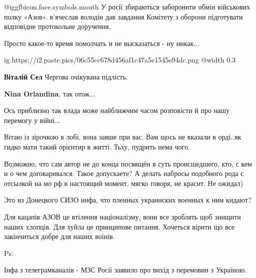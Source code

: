 \begin{itemize}
 @igg{fbicon.face.symbols.mouth}  У росії збираються заборонити обмін військових полку «Азов».
в'ячеслав володін дав завдання Комітету з оборони підготувати відповідне протокольне доручення.

Просто какое-то время помолчать и не высказаться - ну никак...


\ifcmt
  ig https://i2.paste.pics/06c55cc678d456af1c47a5e1545e94dc.png
  @width 0.3
\fi

\begin{itemize} %
\textbf{Віталій Сел} Чергова очікувана підлість.

\textbf{Nina Orlandina}, так отож...
\end{itemize} %

Ось приблизно так влада може найближчим часом розповісти й про нашу перемогу у війні...


Вітаю із зірочкою в лобі, вона завше при вас. Вам щось не вказали в орді..як
гидко мати такий орієнтир в житті. Тьху, пудрить нема чого.


Возможно, что сам автор не до конца посвящён в суть происшедшего, кто, с кем и
о чем договаривался. Такое допускаете? А делать набросы подобного рода с
отсылкой на мо рф в настоящий момент, мягко говоря, не красит. Не ожидал)


Это из Донецкого СИЗО инфа, что пленных украинских военных к ним кидают?


Для кацапів АЗОВ це втілення націоналізму, вони все зроблять щоб знищити наших
хлопців. Для хуйла це принципове питання. Хочеться вірити що все закінчиться
добре для наших воїнів.

Ps:

Інфа з телеграмканалів - МЗС Росії заявило про вихід з перемовин з Україною.

\end{itemize} %
